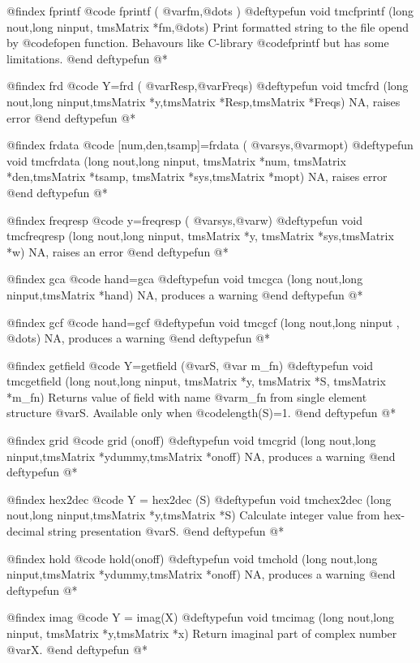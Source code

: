 @findex  fprintf
@code{  fprintf (  @var{fm},@dots{} )}
@deftypefun void tmcfprintf (long nout,long ninput, tmsMatrix *fm,@dots{})
Print formatted string to the file opend by @code{fopen} function. Behavours like C-library @code{fprintf} but has some limitations.
@end deftypefun
@*


@findex  frd
@code{ Y=frd (  @var{Resp},@var{Freqs})}
@deftypefun void tmcfrd (long nout,long ninput,tmsMatrix *y,tmsMatrix *Resp,tmsMatrix *Freqs)
NA, raises   error
@end deftypefun
@*

@findex  frdata
@code{ [num,den,tsamp]=frdata (  @var{sys},@var{mopt})}
@deftypefun void tmcfrdata (long nout,long ninput, tmsMatrix *num, tmsMatrix *den,tmsMatrix *tsamp, tmsMatrix *sys,tmsMatrix *mopt)
NA, raises   error
@end deftypefun
@*

@findex  freqresp
@code{ y=freqresp (  @var{sys},@var{w})}
@deftypefun void tmcfreqresp (long nout,long ninput, tmsMatrix *y, tmsMatrix *sys,tmsMatrix *w)
NA, raises  an error
@end deftypefun
@*

@findex  gca
@code{ hand=gca }
@deftypefun void tmcgca (long nout,long ninput,tmsMatrix *hand)
NA, produces a warning
@end deftypefun
@*

@findex  gcf
@code{ hand=gcf }
@deftypefun void tmcgcf (long nout,long ninput , @dots{})
NA, produces a warning
@end deftypefun
@*

@findex  getfield
@code{ Y=getfield (@var{S},  @var{ m_fn}) }
@deftypefun void tmcgetfield (long nout,long ninput, tmsMatrix *y, tmsMatrix *S, tmsMatrix *m_fn)
Returns   value of field with name @var{m_fn} from single element structure @var{S}. Available only when @code{length(S)=1}.
@end deftypefun
@*

@findex  grid
@code{ grid (onoff) }
@deftypefun void tmcgrid (long nout,long ninput,tmsMatrix *ydummy,tmsMatrix *onoff)
NA, produces a warning
@end deftypefun
@*


@findex  hex2dec
@code{ Y = hex2dec (S) }
@deftypefun void tmchex2dec (long nout,long ninput,tmsMatrix *y,tmsMatrix *S)
Calculate integer value from hex-decimal string presentation @var{S}.
@end deftypefun
@*


@findex  hold
@code{ hold(onoff) }
@deftypefun void tmchold (long nout,long ninput,tmsMatrix *ydummy,tmsMatrix *onoff)
NA, produces a warning
@end deftypefun
@*


@findex  imag
@code{ Y = imag(X) }
@deftypefun void tmcimag (long nout,long ninput, tmsMatrix *y,tmsMatrix *x)
Return imaginal part of complex number @var{X}.
@end deftypefun
@*

